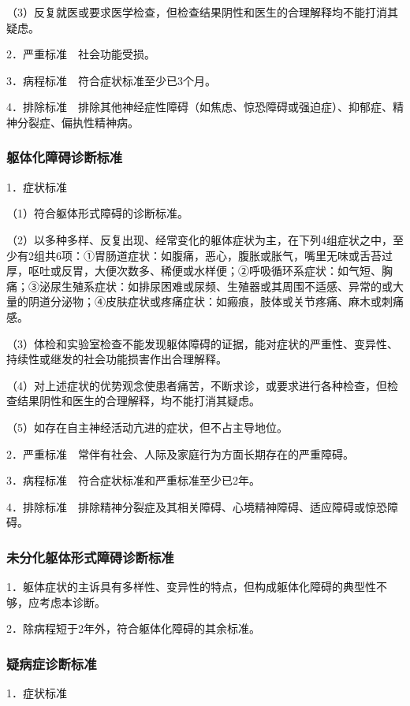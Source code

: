 （3）反复就医或要求医学检查，但检查结果阴性和医生的合理解释均不能打消其疑虑。

2．严重标准　社会功能受损。

3．病程标准　符合症状标准至少已3个月。

4．排除标准　排除其他神经症性障碍（如焦虑、惊恐障碍或强迫症）、抑郁症、精神分裂症、偏执性精神病。

\subsubsection{躯体化障碍诊断标准}

1．症状标准

（1）符合躯体形式障碍的诊断标准。

（2）以多种多样、反复出现、经常变化的躯体症状为主，在下列4组症状之中，至少有2组共6项：①胃肠道症状：如腹痛，恶心，腹胀或胀气，嘴里无味或舌苔过厚，呕吐或反胃，大便次数多、稀便或水样便；②呼吸循环系症状：如气短、胸痛；③泌尿生殖系症状：如排尿困难或尿频、生殖器或其周围不适感、异常的或大量的阴道分泌物；④皮肤症状或疼痛症状：如瘢痕，肢体或关节疼痛、麻木或刺痛感。

（3）体检和实验室检查不能发现躯体障碍的证据，能对症状的严重性、变异性、持续性或继发的社会功能损害作出合理解释。

（4）对上述症状的优势观念使患者痛苦，不断求诊，或要求进行各种检查，但检查结果阴性和医生的合理解释，均不能打消其疑虑。

（5）如存在自主神经活动亢进的症状，但不占主导地位。

2．严重标准　常伴有社会、人际及家庭行为方面长期存在的严重障碍。

3．病程标准　符合症状标准和严重标准至少已2年。

4．排除标准　排除精神分裂症及其相关障碍、心境精神障碍、适应障碍或惊恐障碍。

\subsubsection{未分化躯体形式障碍诊断标准}

1．躯体症状的主诉具有多样性、变异性的特点，但构成躯体化障碍的典型性不够，应考虑本诊断。

2．除病程短于2年外，符合躯体化障碍的其余标准。

\subsubsection{疑病症诊断标准}

1．症状标准

